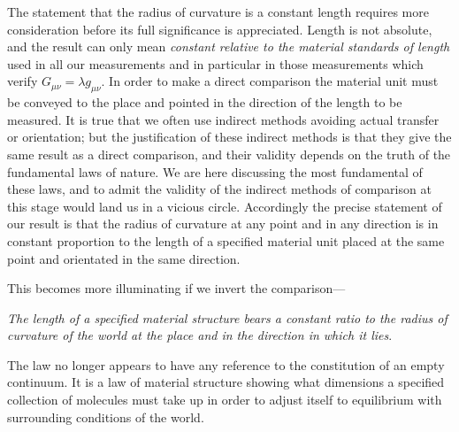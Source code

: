 \documentclass[12pt]{book}
\begin{document}
The statement that the radius of curvature is a constant length requires
more consideration before its full significance is appreciated. Length is not
absolute, and the result can only mean \emph{constant relative to the material standards
of length} used in all our measurements and in particular in those measurements
which verify $G_{\mu\nu} = \lambda g_{\mu\nu}$. In order to make a direct comparison the material
unit must be conveyed to the place and pointed in the direction of the length
to be measured. It is true that we often use indirect methods avoiding actual
transfer or orientation; but the justification of these indirect methods is that
they give the same result as a direct comparison, and their validity depends
on the truth of the fundamental laws of nature. We are here discussing the
most fundamental of these laws, and to admit the validity of the indirect
methods of comparison at this stage would land us in a vicious circle. Accordingly
the precise statement of our result is that the radius of curvature
at any point and in any direction is in constant proportion to the length of a
specified material unit placed at the same point and orientated in the same
direction.

This becomes more illuminating if we invert the comparison---

\emph{The length of a specified material structure bears a constant ratio to the
radius of curvature of the world at the place and in the direction in which it
lies}.\hfill{}\quad\null

The law no longer appears to have any reference to the constitution of an
empty continuum. It is a law of material structure showing what dimensions
a specified collection of molecules must take up in order to adjust itself to
equilibrium with surrounding conditions of the world.
\end{document}
